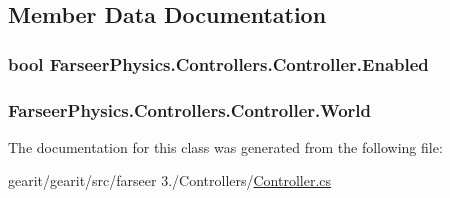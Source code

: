 \subsection{Member Data Documentation}
\hypertarget{class_farseer_physics_1_1_controllers_1_1_controller_a1697ca951f7473b9e293db648b52c184}{
\subsubsection[{Enabled}]{\setlength{\rightskip}{0pt plus 5cm}bool Farseer\+Physics.\+Controllers.\+Controller.\+Enabled}}\label{class_farseer_physics_1_1_controllers_1_1_controller_a1697ca951f7473b9e293db648b52c184}
\hypertarget{class_farseer_physics_1_1_controllers_1_1_controller_ac759af410d23b3ae5fc26a3081b1bde6}{
\subsubsection[{World}]{ Farseer\+Physics.\+Controllers.\+Controller.\+World}}\label{class_farseer_physics_1_1_controllers_1_1_controller_ac759af410d23b3ae5fc26a3081b1bde6}


The documentation for this class was generated from the following file\+:\begin{DoxyCompactItemize}
\item 
gearit/gearit/src/farseer 3./\+Controllers/\hyperlink{_controller_8cs}{Controller.\+cs}\end{DoxyCompactItemize}
